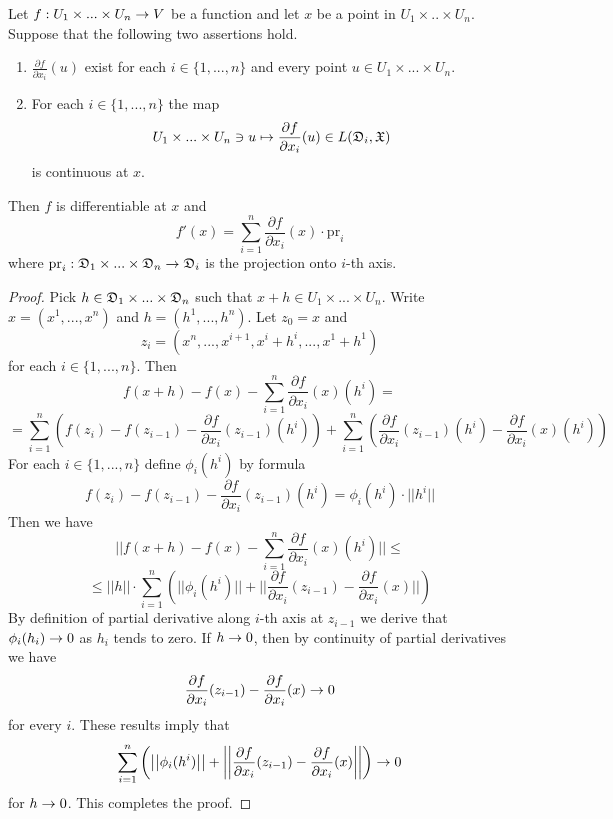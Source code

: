 \begin{theorem}\label{theorem:if_partial_derivatives_exist_and_are_continuous_then_function_is_differentiable}
Let $f:U_1\times ... \times U_n\rightarrow V$ be a function and let $x$ be a point in $U_1\times..\times U_n$. Suppose that the following two assertions hold.
\begin{enumerate}[label=\emph{\textbf{(\arabic*)}}, leftmargin=*]
\item $\frac{\partial f}{\partial x_i}(u)$ exist for each $i\in \{1,...,n\}$ and every point $u \in U_1\times ...\times U_n$. 
\item For each $i \in \{1,...,n\}$ the map
$$U_1\times ... \times U_n \ni u \mapsto \frac{\partial f}{\partial x_i}(u) \in L({\mathfrak D}_i,{\mathfrak X})$$
is continuous at $x$.
\end{enumerate}
Then $f$ is differentiable at $x$ and
$$f'(x) = \sum_{i=1}^n\frac{\partial f}{\partial x_i}(x)\cdot \mathrm{pr}_i$$
where $\mathrm{pr}_i:{\mathfrak D}_1\times ...\times {\mathfrak D}_n\rightarrow {\mathfrak D}_i$ is the projection onto $i$-th axis.
\end{theorem}
\begin{proof}
Pick $h \in {\mathfrak D}_1\times ... \times {\mathfrak D}_n$ such that $x + h \in U_1\times ...\times U_n$. Write $x = (x^1,...,x^n)$ and $h = (h^1,...,h^n)$. Let $z_0 = x$ and 
$$z_i = (x^n,...,x^{i+1},x^{i}+h^{i},...,x^1 + h^1)$$
for each $i\in \{1,...,n\}$. Then
$$f(x + h) - f(x) - \sum_{i=1}^n\frac{\partial f}{\partial x_i}(x)(h^i) =$$
$$= \sum_{i=1}^n\left(f(z_{i}) - f(z_{i-1}) - \frac{\partial f}{\partial x_i}(z_{i-1})(h^i)\right) + \sum_{i=1}^n\left(\frac{\partial f}{\partial x_i}(z_{i-1})(h^i) - \frac{\partial f}{\partial x_i}(x)(h^i)\right)$$
For each $i\in \{1,...,n\}$ define $\phi_i(h^i)$ by formula
$$f(z_{i}) - f(z_{i-1}) - \frac{\partial f}{\partial x_i}(z_{i-1})(h^i) = \phi_i(h^i)\cdot ||h^i||$$
Then we have
$$\bigg|\bigg|f(x + h) - f(x) - \sum_{i=1}^n\frac{\partial f}{\partial x_i}(x)(h^i)\bigg|\bigg| \leq $$
$$\leq ||h||\cdot \sum_{i=1}^n\left(\big|\big|\phi_i(h^i)\big|\big| + \bigg|\bigg|\frac{\partial f}{\partial x_i}(z_{i-1}) - \frac{\partial f}{\partial x_i}(x)\bigg|\bigg|\right)$$
By definition of partial derivative along $i$-th axis at $z_{i-1}$ we derive that $\phi_i(h_i)\rightarrow 0$ as $h_i$ tends to zero. If $h\rightarrow 0$, then by continuity of partial derivatives we have
$$\frac{\partial f}{\partial x_i}(z_{i-1}) - \frac{\partial f}{\partial x_i}(x)\rightarrow 0$$
for every $i$. These results imply that
$$\sum_{i=1}^n\left(\big|\big|\phi_i(h^i)\big|\big| + \bigg|\bigg|\frac{\partial f}{\partial x_i}(z_{i-1}) - \frac{\partial f}{\partial x_i}(x)\bigg|\bigg|\right) \rightarrow 0$$
for $h\rightarrow 0$. This completes the proof.
\end{proof}

